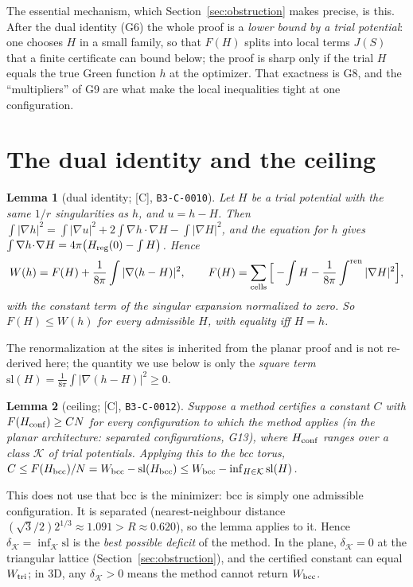 \documentclass[10pt]{article}
\newcommand{\tier}[1]{\textsf{[#1]}}
\newcommand{\cid}[1]{\texttt{B3-#1}}
\newtheorem{lemma}{Lemma}
\theoremstyle{remark}
\begin{document}
The essential mechanism, which Section~\ref{sec:obstruction} makes precise, is this. After the dual identity (G6) the whole proof is a
\emph{lower bound by a trial potential}: one chooses $H$ in a small family, so that $F(H)$ splits into local terms $J(S)$ that a finite
certificate can bound below; the proof is sharp only if the trial $H$ equals the true Green function $h$ at the optimizer. That
exactness is G8, and the ``multipliers'' of G9 are what make the local inequalities tight at one configuration.

\section{The dual identity and the ceiling}\label{sec:dual}
\begin{lemma}[dual identity; \tier{C}, \cid{C-0010}]\label{lem:dual}
Let $H$ be a trial potential with the same $1/r$ singularities as $h$, and $u=h-H$. Then
$\int|\nabla h|^2=\int|\nabla u|^2+2\!\int\!\nabla h\!\cdot\!\nabla H-\int|\nabla H|^2$, and the equation for $h$ gives
$\int\nabla h\!\cdot\!\nabla H=4\pi\big(H_{\rm reg}(0)-\int H\big)$. Hence
\[
W(h)=F(H)+\frac1{8\pi}\int|\nabla(h-H)|^2,\qquad F(H)=\sum_{\rm cells}\Big[-\!\int H-\frac1{8\pi}\int^{\rm ren}|\nabla H|^2\Big],
\]
with the constant term of the singular expansion normalized to zero. So $F(H)\le W(h)$ for every admissible $H$, with equality iff $H=h$.
\end{lemma}
The renormalization at the sites is inherited from the planar proof and is not re-derived here; the quantity we use below is only the
\emph{square term} $\mathrm{sl}(H)=\frac1{8\pi}\int|\nabla(h-H)|^2\ge0$.

\begin{lemma}[ceiling; \tier{C}, \cid{C-0012}]\label{lem:ceiling}
Suppose a method certifies a constant $C$ with $F(H_{\rm conf})\ge CN$ for every configuration to which the method applies (in the planar architecture: separated configurations, G13), where $H_{\rm conf}$ ranges over a class $\mathcal K$ of trial
potentials. Applying this to the bcc torus, $C\le F(H_{\rm bcc})/N=W_{\rm bcc}-\mathrm{sl}(H_{\rm bcc})\le W_{\rm bcc}-\inf_{H\in\mathcal K}\mathrm{sl}(H)$.
\end{lemma}
This does not use that bcc is the minimizer: bcc is simply one admissible configuration. It is separated (nearest-neighbour distance $(\sqrt3/2)2^{1/3}\approx1.091>R\approx0.620$), so the lemma applies to it. Hence $\delta_{\mathcal K}=\inf_{\mathcal K}\mathrm{sl}$ is the
\emph{best possible deficit} of the method. In the plane, $\delta_{\mathcal K}=0$ at the triangular lattice (Section~\ref{sec:obstruction}), and the certified constant can equal $W_{\rm tri}$;
in 3D, any $\delta_{\mathcal K}>0$ means the method cannot return $W_{\rm bcc}$.
\end{document}
